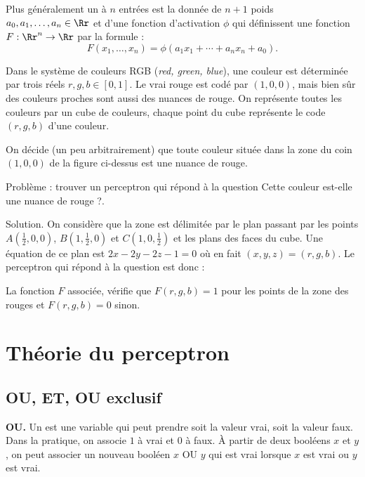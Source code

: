 \documentclass[11pt,class=report,crop=false]{standalone}
\begin{document}
Plus généralement un  à $n$ entrées est la donnée de $n+1$ poids $a_0,a_1,\ldots,a_n \in \Rr$
et d'une fonction d'activation $\phi$ qui définissent une fonction $F : \Rr^n \to \Rr$
par la formule :
$$F(x_1,\ldots,x_n) = \phi(a_1 x_1 + \cdots + a_n x_n + a_0).$$

\begin{exemple}
Dans le système de couleurs RGB (\emph{red, green, blue}), une couleur est déterminée par trois réels $r,g,b \in [0,1]$.
Le \og{}vrai\fg{} rouge est codé par $(1,0,0)$, mais bien sûr des couleurs proches sont aussi des nuances de rouge.
On représente toutes les couleurs par un \og{}cube de couleurs\fg{}, chaque point du cube représente le code $(r,g,b)$ d'une couleur.


On décide (un peu arbitrairement) que toute couleur située dans la zone du coin $(1,0,0)$ de la figure ci-dessus est une nuance de rouge.

Problème : trouver un perceptron qui répond à la question \og{}Cette couleur est-elle une nuance de rouge ?\fg{}.

Solution. On considère que la zone est délimitée par le plan passant par les points $A(\frac12,0,0)$, $B(1,\frac12,0)$ et $C(1,0,\frac12)$ et les plans des faces du cube.
Une équation de ce plan est $2x-2y-2z-1 = 0$ où en fait $(x,y,z)=(r,g,b)$.
Le perceptron qui répond à la question est donc :


La fonction $F$ associée, vérifie que $F(r,g,b) = 1$ pour les points de la zone des rouges et $F(r,g,b)=0$ sinon.
 
\end{exemple}



\section{Théorie du perceptron}

\subsection{OU, ET, OU exclusif}

\textbf{OU.}
Un  est une variable qui peut prendre soit la valeur \og{}vrai\fg{}, soit la valeur \og{}faux\fg{}. 
Dans la pratique, on associe $1$ à \og{}vrai\fg{} et $0$ à \og{}faux\fg. \`A partir de deux booléens $x$ et $y$, on peut associer un nouveau booléen
\og{}$x$ OU $y$\fg{} qui est vrai lorsque $x$ est vrai ou $y$ est vrai.
 
\end{document}
